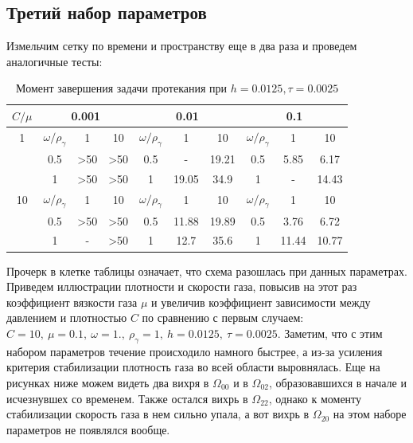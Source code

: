 \documentclass[specialist,subf,href,colorlinks=true,12pt
,times,mtpro,specialist
]{disser}
\begin{document}
\subsection {Третий набор параметров}

Измельчим сетку по времени и пространству еще в два раза и проведем аналогичные тесты:

\begin{table}[H]
\caption{Момент завершения задачи протекания при $h = 0.0125, \tau = 0.0025$}
\begin{center}
\begin{tabular}{|c|c|c|c|c|c|c|c|c|c|}
\hline
$C / \mu$ & \multicolumn{3}{c|}{0.001} & \multicolumn{3}{c|}{0.01} & \multicolumn{3}{c|}{0.1} \\
\hline
1 & $\omega / \rho_\gamma$ & 1 & 10 & $\omega / \rho_\gamma$ & 1 & 10 & $\omega / \rho_\gamma$ & 1 & 10  \\
\cline{2-10}
  & 0.5 & >50 & >50 & 0.5 & -  & 19.21 & 0.5 & 5.85  & 6.17   \\
\cline{2-10}
  & 1 & >50  & >50  & 1 & 19.05 & 34.9 & 1 & -  & 14.43   \\
\hline
10 & $\omega / \rho_\gamma$ & 1 & 10 & $\omega / \rho_\gamma$ & 1 & 10 & $\omega / \rho_\gamma$ & 1 & 10  \\
\cline{2-10}
  & 0.5 & >50 & >50 & 0.5 & 11.88  & 19.89  & 0.5 & 3.76 & 6.72  \\
\cline{2-10}
  & 1 & - & >50 & 1 & 12.7 & 35.6 & 1 & 11.44 & 10.77  \\
\hline
\end{tabular}
\end{center}
\end{table}

Прочерк в клетке таблицы означает, что схема разошлась при данных параметрах. Приведем иллюстрации плотности и скорости газа, повысив на этот раз коэффициент вязкости газа $\mu$ и увеличив коэффициент зависимости между давлением и плотностью $C$ по сравнению с первым случаем: $C = 10,\ \mu = 0.1,\ \omega = 1.,\ \rho_\gamma = 1,\ h = 0.0125,\ \tau = 0.0025$. Заметим, что с этим набором параметров течение происходило намного быстрее, а из-за усиления критерия стабилизации плотность газа во всей области выровнялась. Еще на рисунках ниже можем видеть два вихря в $\Omega_{00}$ и в $\Omega_{02}$, образовавшихся в начале и исчезнувшех со временем. Также остался вихрь в $\Omega_{22}$, однако к моменту стабилизации скорость газа в нем сильно упала, а вот вихрь в $\Omega_{20}$ на этом наборе параметров не появлялся вообще.
\end{document}
